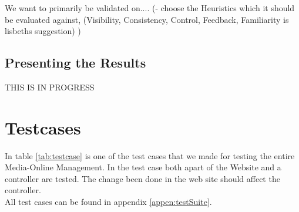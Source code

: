 We want to primarily be validated on....
(- choose the Heuristics which it should be evaluated against,
(Visibility, Consistency, Control, Feedback, Familiarity is lisbeths suggestion) ) 


\subsection{Presenting the Results}
 THIS IS IN PROGRESS

\section{Testcases}
\label{sec:testcase}
In table \ref{tab:testcase} is one of the test cases that we made for testing the entire Media-Online Management. In the test case both apart of the Website and a controller are tested. The change been done in the web site should affect the controller.\\ 
 All test cases can be found in appendix \vref{appen:testSuite}.
